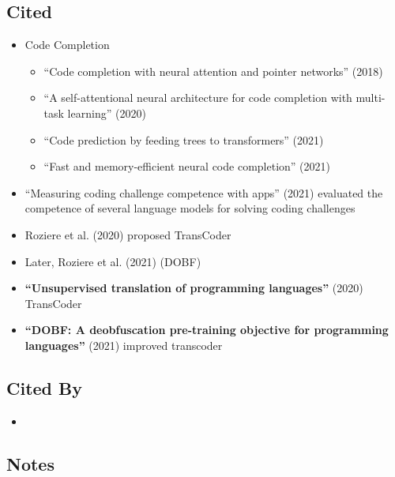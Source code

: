 \documentclass{article}
\begin{document}
\subsection*{Cited}
\begin{itemize}
	\item Code Completion
	\begin{itemize}
		\item ``Code completion with neural attention and pointer networks'' (2018)
		\item ``A self-attentional neural architecture for code completion with multi-task learning'' (2020)
		\item ``Code prediction by feeding trees to transformers'' (2021)
		\item ``Fast and memory-efficient neural code completion'' (2021)
	\end{itemize}
	\item ``Measuring coding challenge competence with apps'' (2021) evaluated the competence of several language models for solving coding challenges
	\item Roziere et al. (2020) proposed TransCoder
	\item Later, Roziere et al. (2021)  (DOBF)
	\item \textbf{``Unsupervised translation of programming languages''} (2020) TransCoder
	\item \textbf{``DOBF: A deobfuscation pre-training objective for programming languages''} (2021) improved transcoder
\end{itemize}

\subsection*{Cited By}
\begin{itemize}
	\item
\end{itemize}

\subsection*{Notes}
\end{document}
